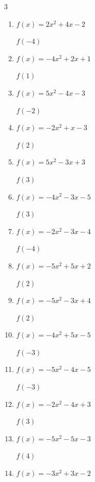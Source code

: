 \begin{multicols}{3}
\begin{enumerate}
$f(-3)$
        \phantom{$= -1$}

  \item $f(x)=2x^{2}+4x-2$

$f(-4)$
        \phantom{$= 14$}

  \item $f(x)=-4x^{2}+2x+1$

$f(1)$
        \phantom{$= -1$}

  \item $f(x)=5x^{2}-4x-3$

$f(-2)$
        \phantom{$= 25$}

  \item $f(x)=-2x^{2}+x-3$

$f(2)$
        \phantom{$= -9$}

  \item $f(x)=5x^{2}-3x+3$

$f(3)$
        \phantom{$= 39$}

  \item $f(x)=-4x^{2}-3x-5$

$f(3)$
        \phantom{$= -50$}

  \item $f(x)=-2x^{2}-3x-4$

$f(-4)$
        \phantom{$= -24$}

  \item $f(x)=-5x^{2}+5x+2$

$f(2)$
        \phantom{$= -8$}

\columnbreak %

  \item $f(x)=-5x^{2}-3x+4$

$f(2)$
        \phantom{$= -22$}

  \item $f(x)=-4x^{2}+5x-5$

$f(-3)$
        \phantom{$= -56$}

  \item $f(x)=-5x^{2}-4x-5$

$f(-3)$
        \phantom{$= -38$}

  \item $f(x)=-2x^{2}-4x+3$

$f(3)$
        \phantom{$= -27$}

  \item $f(x)=-5x^{2}-5x-3$

$f(4)$
        \phantom{$= -103$}

  \item $f(x)=-3x^{2}+3x-2$


\end{enumerate}
\end{multicols}
